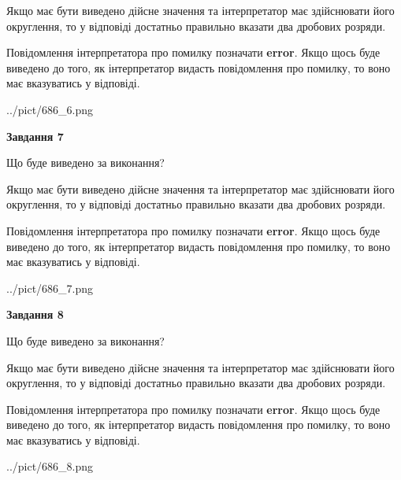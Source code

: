 \documentclass[12pt, ukrainian]{article}
\begin{document}
{\begin {Large}
Якщо має бути виведено дійсне значення та інтерпретатор має здійснювати його округлення, 
то у відповіді достатньо правильно вказати два дробових розряди.

Повідомлення інтерпретатора про помилку позначати \textbf{error}.
Якщо щось буде виведено до того, як інтерпретатор видасть повідомлення про помилку, 
то воно має вказуватись у відповіді. \par

\begin{center}
	{../pict/686_6.png}
\end{center}
\newpage

{\begin {center}\textbf{Завдання 7}\end {center}}\par
Що буде виведено за виконання? \par

Якщо має бути виведено дійсне значення та інтерпретатор має здійснювати його округлення, 
то у відповіді достатньо правильно вказати два дробових розряди.

Повідомлення інтерпретатора про помилку позначати \textbf{error}.
Якщо щось буде виведено до того, як інтерпретатор видасть повідомлення про помилку, 
то воно має вказуватись у відповіді. \par

\begin{center}
	{../pict/686_7.png}
\end{center}
\newpage

{\begin {center}\textbf{Завдання 8}\end {center}}\par
Що буде виведено за виконання? \par

Якщо має бути виведено дійсне значення та інтерпретатор має здійснювати його округлення, 
то у відповіді достатньо правильно вказати два дробових розряди.

Повідомлення інтерпретатора про помилку позначати \textbf{error}.
Якщо щось буде виведено до того, як інтерпретатор видасть повідомлення про помилку, 
то воно має вказуватись у відповіді. \par

\begin{center}
	{../pict/686_8.png}
\end{center}
\newpage


\end{Large}}
\end{document}
